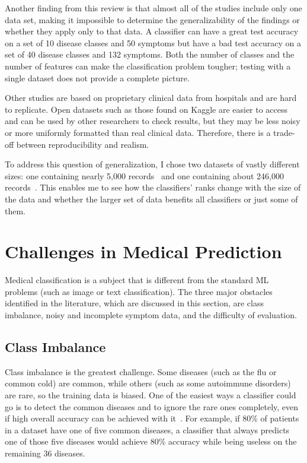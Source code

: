 Another finding from this review is that almost all of the studies include only one data set, making it impossible to determine the generalizability of the findings or whether they apply only to that data. A classifier can have a great test accuracy on a set of 10 disease classes and 50 symptoms but have a bad test accuracy on a set of 40 disease classes and 132 symptoms. Both the number of classes and the number of features can make the classification problem tougher; testing with a single dataset does not provide a complete picture.

Other studies are based on proprietary clinical data from hospitals and are hard to replicate. Open datasets such as those found on Kaggle are easier to access and can be used by other researchers to check results, but they may be less noisy or more uniformly formatted than real clinical data. Therefore, there is a trade-off between reproducibility and realism.

To address this question of generalization, I chose two datasets of vastly different sizes: one containing nearly 5{,}000 records~\citep{Kaggle_Disease2020} and one containing about 246{,}000 records~\citep{Kaggle_Diseases2023}. This enables me to see how the classifiers' ranks change with the size of the data and whether the larger set of data benefits all classifiers or just some of them.

\section{Challenges in Medical Prediction}
\label{sec:challenges}

Medical classification is a subject that is different from the standard ML problems (such as image or text classification). The three major obstacles identified in the literature, which are discussed in this section, are class imbalance, noisy and incomplete symptom data, and the difficulty of evaluation.

\subsection{Class Imbalance}

Class imbalance is the greatest challenge. Some diseases (such as the flu or common cold) are common, while others (such as some autoimmune disorders) are rare, so the training data is biased. One of the easiest ways a classifier could go is to detect the common diseases and to ignore the rare ones completely, even if high overall accuracy can be achieved with it~\citep{Haixiang2017}. For example, if 80\% of patients in a dataset have one of five common diseases, a classifier that always predicts one of those five diseases would achieve 80\% accuracy while being useless on the remaining 36 diseases.

